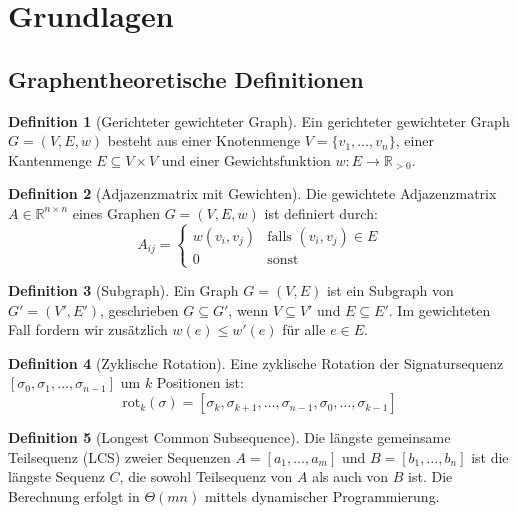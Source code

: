 ﻿\documentclass[a4paper,12pt]{article}
\theoremstyle{definition}
\newtheorem{definition}{Definition}
\begin{document}
\section{Grundlagen}
\label{sec:grundlagen}

\subsection{Graphentheoretische Definitionen}

\begin{definition}[Gerichteter gewichteter Graph]
    Ein gerichteter gewichteter Graph $G = (V, E, w)$ besteht aus einer
    Knotenmenge $V = \{v_1, \ldots, v_n\}$, einer Kantenmenge
    $E \subseteq V \times V$ und einer Gewichtsfunktion
    $w: E \to \mathbb{R}_{> 0}$.
\end{definition}

\begin{definition}[Adjazenzmatrix mit Gewichten]
    Die gewichtete Adjazenzmatrix $A \in \mathbb{R}^{n \times n}$ eines
    Graphen $G = (V, E, w)$ ist definiert durch:
    \[
    A_{ij} = \begin{cases}
        w(v_i, v_j) & \text{falls } (v_i, v_j) \in E \\
        0 & \text{sonst}
    \end{cases}
    \]
\end{definition}

\begin{definition}[Subgraph]
    Ein Graph $G = (V, E)$ ist ein Subgraph von $G' = (V', E')$,
    geschrieben $G \subseteq G'$, wenn $V \subseteq V'$ und $E \subseteq E'$.
    Im gewichteten Fall fordern wir zus\"atzlich $w(e) \leq w'(e)$ f\"ur alle $e \in E$.
\end{definition}

\begin{definition}[Zyklische Rotation]
    Eine zyklische Rotation der Signatursequenz $[\sigma_0, \sigma_1, \ldots, \sigma_{n-1}]$
    um $k$ Positionen ist:
    \[
    \mathrm{rot}_k(\sigma) = [\sigma_k, \sigma_{k+1}, \ldots, \sigma_{n-1}, \sigma_0, \ldots, \sigma_{k-1}]
    \]
\end{definition}

\begin{definition}[Longest Common Subsequence]
    Die l\"angste gemeinsame Teilsequenz (LCS) zweier Sequenzen $A = [a_1, \ldots, a_m]$
    und $B = [b_1, \ldots, b_n]$ ist die l\"angste Sequenz $C$, die sowohl Teilsequenz
    von $A$ als auch von $B$ ist. Die Berechnung erfolgt in $\Theta(mn)$ mittels
    dynamischer Programmierung.
\end{definition}
\end{document}
